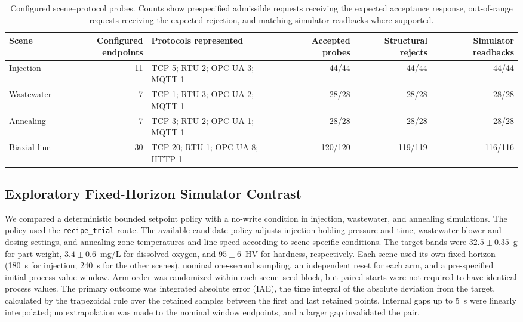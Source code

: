 \documentclass[journal]{IEEEtran}
\begin{document}
\begin{table}[!t]
\centering
\caption{Configured scene--protocol probes. Counts show prespecified admissible requests receiving the expected acceptance response, out-of-range requests receiving the expected rejection, and matching simulator readbacks where supported.}
\label{tab:scene-probe-results}
\footnotesize
\setlength{\tabcolsep}{3pt}
\begin{tabularx}{\textwidth}{@{}>{\raggedright\arraybackslash}p{1.55cm}r X r r r@{}}
\toprule
Scene & Configured endpoints & Protocols represented & Accepted probes & Structural rejects & Simulator readbacks \\
\midrule
Injection & 11 & TCP 5; RTU 2; OPC UA 3; MQTT 1 & 44/44 & 44/44 & 44/44 \\
Wastewater & 7 & TCP 1; RTU 3; OPC UA 2; MQTT 1 & 28/28 & 28/28 & 28/28 \\
Annealing & 7 & TCP 3; RTU 2; OPC UA 1; MQTT 1 & 28/28 & 28/28 & 28/28 \\
Biaxial line & 30 & TCP 20; RTU 1; OPC UA 8; HTTP 1 & 120/120 & 119/119 & 116/116 \\
\bottomrule
\end{tabularx}
\end{table}

\subsection{Exploratory Fixed-Horizon Simulator Contrast}
\label{sec:eval-optimization}
We compared a deterministic bounded setpoint policy with a no-write condition in injection, wastewater, and annealing simulations. The policy used the \texttt{recipe\_trial} route. The available candidate policy adjusts injection holding pressure and time, wastewater blower and dosing settings, and annealing-zone temperatures and line speed according to scene-specific conditions. The target bands were $32.5\pm0.35$~g for part weight, $3.4\pm0.6$~mg/L for dissolved oxygen, and $95\pm6$~HV for hardness, respectively. Each scene used its own fixed horizon (180~s for injection; 240~s for the other scenes), nominal one-second sampling, an independent reset for each arm, and a pre-specified initial-process-value window. Arm order was randomized within each scene--seed block, but paired starts were not required to have identical process values. The primary outcome was integrated absolute error (IAE), the time integral of the absolute deviation from the target, calculated by the trapezoidal rule over the retained samples between the first and last retained points. Internal gaps up to 5~s were linearly interpolated; no extrapolation was made to the nominal window endpoints, and a larger gap invalidated the pair.
\end{document}
